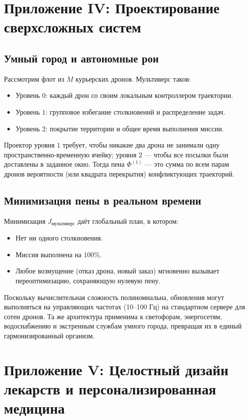 \documentclass[11pt,a4paper]{article}
\theoremstyle{definition}
\newcommand{\Foam}{\Phi}
\newcommand{\Jfunc}{J_{\text{мультиверс}}}
\begin{document}
\section{Приложение IV: Проектирование сверхсложных систем}

\subsection{Умный город и автономные рои}

Рассмотрим флот из $M$ курьерских дронов. Мультиверс таков:
\begin{itemize}
    \item Уровень $0$: каждый дрон со своим локальным контроллером траектории.
    \item Уровень $1$: групповое избегание столкновений и распределение задач.
    \item Уровень $2$: покрытие территории и общее время выполнения миссии.
\end{itemize}

Проектор уровня $1$ требует, чтобы никакие два дрона не занимали одну пространственно-временную ячейку; уровня $2$ — чтобы все посылки были доставлены в заданное окно. Тогда пена $\Foam^{(1)}$ — это сумма по всем парам дронов вероятности (или квадрата перекрытия) конфликтующих траекторий.

\subsection{Минимизация пены в реальном времени}

Минимизация $\Jfunc$ даёт глобальный план, в котором:
\begin{itemize}
    \item Нет ни одного столкновения.
    \item Миссия выполнена на 100\%.
    \item Любое возмущение (отказ дрона, новый заказ) мгновенно вызывает переоптимизацию, сохраняющую нулевую пену.
\end{itemize}
Поскольку вычислительная сложность полиномиальна, обновления могут выполняться на управляющих частотах (10–100 Гц) на стандартном сервере для сотен дронов. Та же архитектура применима к светофорам, энергосетям, водоснабжению и экстренным службам умного города, превращая их в единый гармонизированный организм.

\section{Приложение V: Целостный дизайн лекарств и персонализированная медицина}
\end{document}
